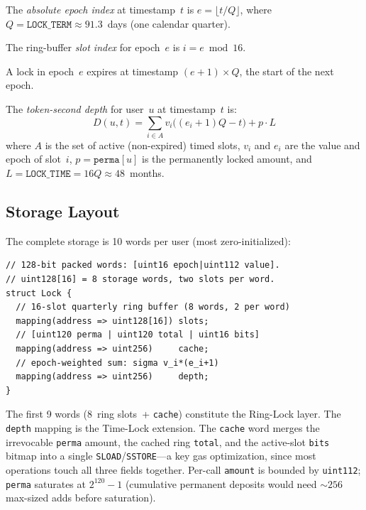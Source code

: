 \documentclass[10pt,a4paper,twocolumn]{article}
\begin{document}
\begin{definition}[Epoch]
\label{def:epoch}
The \emph{absolute epoch index} at timestamp~$t$ is $e = \lfloor t / Q \rfloor$, where $Q = \texttt{LOCK\_TERM} \approx 91.3$~days (one calendar quarter).
\end{definition}

\begin{definition}
\label{def:slot-index}
The ring-buffer \emph{slot index} for epoch~$e$ is $i = e \bmod 16$.
\end{definition}

\begin{definition}
\label{def:lock-expiry}
A lock in epoch~$e$ expires at timestamp $(e{+}1) \times Q$, the start of the next epoch.
\end{definition}

\begin{definition}
\label{def:token-seconds}
The \emph{token-second depth} for user~$u$ at timestamp~$t$ is:
\begin{equation}
\label{eq:token-seconds}
D(u,t) = \sum_{i \in A} v_i \bigl((e_i{+}1)Q - t\bigr) + p \cdot L
\end{equation}
where $A$ is the set of active (non-expired) timed slots, $v_i$ and $e_i$ are the value and epoch of slot~$i$, $p = \texttt{perma}[u]$ is the permanently locked amount, and $L = \texttt{LOCK\_TIME} = 16Q \approx 48$~months.
\end{definition}

\subsection{Storage Layout}
\label{subsec:storage-layout}

The complete storage is 10 words per user (most zero-initialized):

\begin{lstlisting}[language=Solidity, caption={Lock storage layout}, label={lst:lock-struct}]
// 128-bit packed words: [uint16 epoch|uint112 value].
// uint128[16] = 8 storage words, two slots per word.
struct Lock {
  // 16-slot quarterly ring buffer (8 words, 2 per word)
  mapping(address => uint128[16]) slots;
  // [uint120 perma | uint120 total | uint16 bits]
  mapping(address => uint256)     cache;
  // epoch-weighted sum: sigma v_i*(e_i+1)
  mapping(address => uint256)     depth;
}
\end{lstlisting}

The first 9 words (8~ring slots~+ \texttt{cache}) constitute the Ring-Lock layer. The \texttt{depth} mapping is the Time-Lock extension. The \texttt{cache} word merges the irrevocable \texttt{perma} amount, the cached ring \texttt{total}, and the active-slot \texttt{bits} bitmap into a single \texttt{SLOAD}/\texttt{SSTORE}---a key gas optimization, since most operations touch all three fields together. Per-call \texttt{amount} is bounded by \texttt{uint112}; \texttt{perma} saturates at $2^{120}{-}1$ (cumulative permanent deposits would need ${\sim}256$ max-sized adds before saturation).
\end{document}
